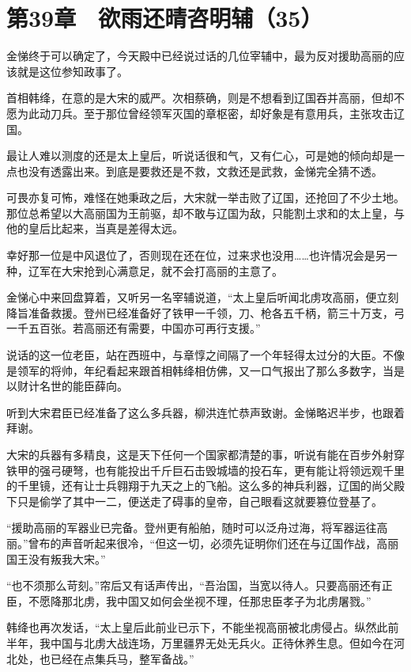 \section{第39章　欲雨还晴咨明辅（35）}

金悌终于可以确定了，今天殿中已经说过话的几位宰辅中，最为反对援助高丽的应该就是这位参知政事了。

首相韩绛，在意的是大宋的威严。次相蔡确，则是不想看到辽国吞并高丽，但却不愿为此动刀兵。至于那位曾经领军灭国的章枢密，却好象是有意用兵，主张攻击辽国。

最让人难以测度的还是太上皇后，听说话很和气，又有仁心，可是她的倾向却是一点也没有透露出来。到底是要救还是不救，文救还是武救，金悌完全猜不透。

可畏亦复可怖，难怪在她秉政之后，大宋就一举击败了辽国，还抢回了不少土地。那位总希望以大高丽国为王前驱，却不敢与辽国为敌，只能割土求和的太上皇，与他的皇后比起来，当真是差得太远。

幸好那一位是中风退位了，否则现在还在位，过来求也没用……也许情况会是另一种，辽军在大宋抢到心满意足，就不会打高丽的主意了。

金悌心中来回盘算着，又听另一名宰辅说道，“太上皇后听闻北虏攻高丽，便立刻降旨准备救援。登州已经准备好了铁甲一千领，刀、枪各五千柄，箭三十万支，弓一千五百张。若高丽还有需要，中国亦可再行支援。”

说话的这一位老臣，站在西班中，与章惇之间隔了一个年轻得太过分的大臣。不像是领军的将帅，年纪看起来跟首相韩绛相仿佛，又一口气报出了那么多数字，当是以财计名世的能臣薛向。

听到大宋君臣已经准备了这么多兵器，柳洪连忙恭声致谢。金悌略迟半步，也跟着拜谢。

大宋的兵器有多精良，这是天下任何一个国家都清楚的事，听说有能在百步外射穿铁甲的强弓硬弩，也有能投出千斤巨石击毁城墙的投石车，更有能让将领远观千里的千里镜，还有让士兵翱翔于九天之上的飞船。这么多的神兵利器，辽国的尚父殿下只是偷学了其中一二，便送走了碍事的皇帝，自己眼看这就要篡位登基了。

“援助高丽的军器业已完备。登州更有船舶，随时可以泛舟过海，将军器运往高丽。”曾布的声音听起来很冷，“但这一切，必须先证明你们还在与辽国作战，高丽国王没有叛我大宋。”

“也不须那么苛刻。”帘后又有话声传出，“吾治国，当宽以待人。只要高丽还有正臣，不愿降那北虏，我中国又如何会坐视不理，任那忠臣孝子为北虏屠戮。”

韩绛也再次发话，“太上皇后此前业已示下，不能坐视高丽被北虏侵占。纵然此前半年，我中国与北虏大战连场，万里疆界无处无兵火。正待休养生息。但如今在河北处，也已经在点集兵马，整军备战。”

